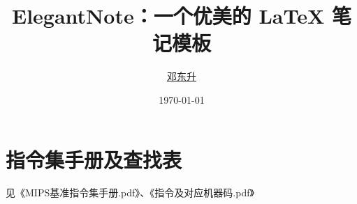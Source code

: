 \documentclass[cn,blue,normal,11pt]{elegantnote}
\title{ElegantNote：一个优美的 \LaTeX{} 笔记模板}
\author{\href{https://ddswhu.me/}{邓东升}}
\institute{\href{https://elegantlatex.org/}{Elegant\LaTeX{} Program}}
\date{\today}
\begin{document}



\newpage



\newpage




% 


% 
\newpage
\appendix
\section{指令集手册及查找表}
见《MIPS基准指令集手册.pdf》、《指令及对应机器码.pdf》




\end{document}
